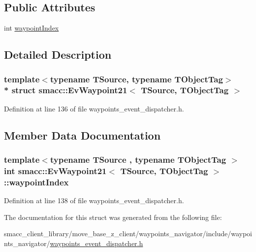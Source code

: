 \subsection*{Public Attributes}
\begin{DoxyCompactItemize}
\item 
int \hyperlink{structsmacc_1_1EvWaypoint21_a1354a08c2c4319137555132d8a8f62f4}{waypoint\+Index}
\end{DoxyCompactItemize}


\subsection{Detailed Description}
\subsubsection*{template$<$typename T\+Source, typename T\+Object\+Tag$>$\\*
struct smacc\+::\+Ev\+Waypoint21$<$ T\+Source, T\+Object\+Tag $>$}



Definition at line 136 of file waypoints\+\_\+event\+\_\+dispatcher.\+h.



\subsection{Member Data Documentation}
\subsubsection[{\texorpdfstring{waypoint\+Index}{waypointIndex}}]{\setlength{\rightskip}{0pt plus 5cm}template$<$typename T\+Source , typename T\+Object\+Tag $>$ int {\bf smacc\+::\+Ev\+Waypoint21}$<$ T\+Source, T\+Object\+Tag $>$\+::waypoint\+Index}\hypertarget{structsmacc_1_1EvWaypoint21_a1354a08c2c4319137555132d8a8f62f4}{}\label{structsmacc_1_1EvWaypoint21_a1354a08c2c4319137555132d8a8f62f4}


Definition at line 138 of file waypoints\+\_\+event\+\_\+dispatcher.\+h.



The documentation for this struct was generated from the following file\+:\begin{DoxyCompactItemize}
\item 
smacc\+\_\+client\+\_\+library/move\+\_\+base\+\_\+z\+\_\+client/waypoints\+\_\+navigator/include/waypoints\+\_\+navigator/\hyperlink{waypoints__event__dispatcher_8h}{waypoints\+\_\+event\+\_\+dispatcher.\+h}\end{DoxyCompactItemize}
